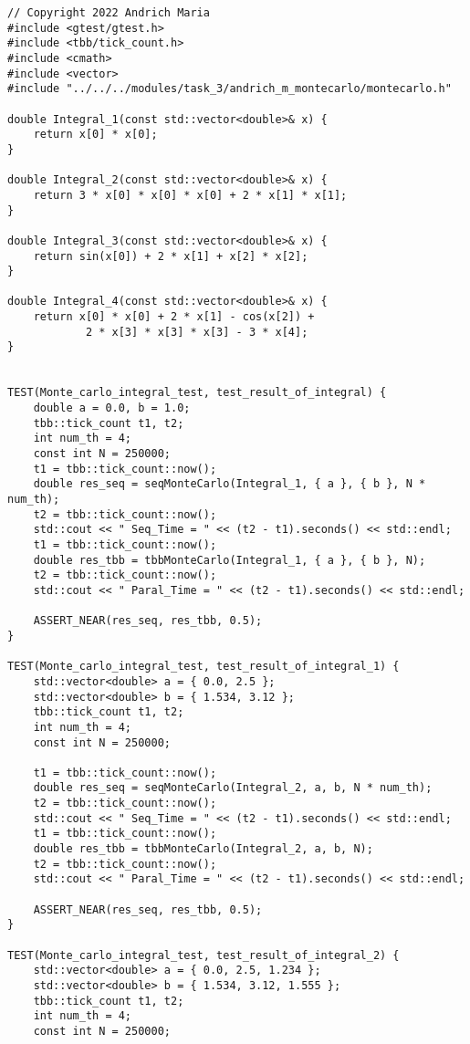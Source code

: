 \documentclass{report}
\begin{document}
\begin{lstlisting}
// Copyright 2022 Andrich Maria
#include <gtest/gtest.h>
#include <tbb/tick_count.h>
#include <cmath>
#include <vector>
#include "../../../modules/task_3/andrich_m_montecarlo/montecarlo.h"

double Integral_1(const std::vector<double>& x) {
    return x[0] * x[0];
}

double Integral_2(const std::vector<double>& x) {
    return 3 * x[0] * x[0] * x[0] + 2 * x[1] * x[1];
}

double Integral_3(const std::vector<double>& x) {
    return sin(x[0]) + 2 * x[1] + x[2] * x[2];
}

double Integral_4(const std::vector<double>& x) {
    return x[0] * x[0] + 2 * x[1] - cos(x[2]) +
            2 * x[3] * x[3] * x[3] - 3 * x[4];
}


TEST(Monte_carlo_integral_test, test_result_of_integral) {
    double a = 0.0, b = 1.0;
    tbb::tick_count t1, t2;
    int num_th = 4;
    const int N = 250000;
    t1 = tbb::tick_count::now();
    double res_seq = seqMonteCarlo(Integral_1, { a }, { b }, N * num_th);
    t2 = tbb::tick_count::now();
    std::cout << " Seq_Time = " << (t2 - t1).seconds() << std::endl;
    t1 = tbb::tick_count::now();
    double res_tbb = tbbMonteCarlo(Integral_1, { a }, { b }, N);
    t2 = tbb::tick_count::now();
    std::cout << " Paral_Time = " << (t2 - t1).seconds() << std::endl;

    ASSERT_NEAR(res_seq, res_tbb, 0.5);
}

TEST(Monte_carlo_integral_test, test_result_of_integral_1) {
    std::vector<double> a = { 0.0, 2.5 };
    std::vector<double> b = { 1.534, 3.12 };
    tbb::tick_count t1, t2;
    int num_th = 4;
    const int N = 250000;

    t1 = tbb::tick_count::now();
    double res_seq = seqMonteCarlo(Integral_2, a, b, N * num_th);
    t2 = tbb::tick_count::now();
    std::cout << " Seq_Time = " << (t2 - t1).seconds() << std::endl;
    t1 = tbb::tick_count::now();
    double res_tbb = tbbMonteCarlo(Integral_2, a, b, N);
    t2 = tbb::tick_count::now();
    std::cout << " Paral_Time = " << (t2 - t1).seconds() << std::endl;

    ASSERT_NEAR(res_seq, res_tbb, 0.5);
}

TEST(Monte_carlo_integral_test, test_result_of_integral_2) {
    std::vector<double> a = { 0.0, 2.5, 1.234 };
    std::vector<double> b = { 1.534, 3.12, 1.555 };
    tbb::tick_count t1, t2;
    int num_th = 4;
    const int N = 250000;


\end{lstlisting}
\end{document}
